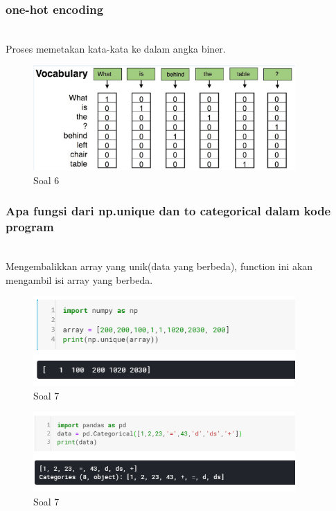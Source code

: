 	\subsubsection{one-hot encoding}
	\hfill\\
Proses memetakan kata-kata ke dalam angka biner.

	\begin{figure}[H]
		\begin{center}
		 \includegraphics[width=10cm]{figures/1174076/figures6/teori6.png}
		 \caption{Soal 6}	
		\end{center}
	\end{figure}
	 
	\subsubsection{Apa fungsi dari np.unique dan to categorical dalam kode program}
	\hfill\\
Mengembalikkan array yang unik(data yang berbeda), function ini akan mengambil isi array yang berbeda.

	\begin{figure}[H]
		\begin{center}
		 \includegraphics[width=10cm]{figures/1174076/figures6/teori7.png}
		 \caption{Soal 7}	
		\end{center}
	\end{figure}
	
	\begin{figure}[H]
		\begin{center}
		 \includegraphics[width=10cm]{figures/1174076/figures6/teori7_2.png}
		 \caption{Soal 7}	
		\end{center}
	\end{figure}
	 
